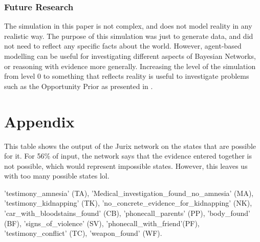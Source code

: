 \documentclass[12pt]{article}
\begin{document}
\subsubsection{Future Research}

The simulation in this paper is not complex, and does not model reality in any realistic way. The purpose of this simulation was just to generate data, and did not need to reflect any specific facts about the world. However, agent-based modelling can be useful for investigating different aspects of Bayesian Networks, or reasoning with evidence more generally. Increasing the level of the simulation from level 0 to something that reflects reality is useful to investigate problems such as the Opportunity Prior as presented in \citet{Fenton2017}. 

\newpage



\newpage
\section*{Appendix}

This table shows the output of the Jurix network on the states that are possible for it. For 56\% of input, the network says that the evidence entered together is not possible, which would represent impossible states. However, this leaves us with too many possible states lol.

'testimony\_amnesia' (TA), 'Medical\_investigation\_found\_no\_amnesia' (MA), 'testimony\_kidnapping' (TK), 'no\_concrete\_evidence\_for\_kidnapping' (NK), 'car\_with\_bloodstains\_found' (CB), 'phonecall\_parents' (PP), 'body\_found' (BF), 'signs\_of\_violence' (SV), 'phonecall\_with\_friend'(PF), 'testimony\_conflict' (TC), 'weapon\_found' (WF).

\end{document}
